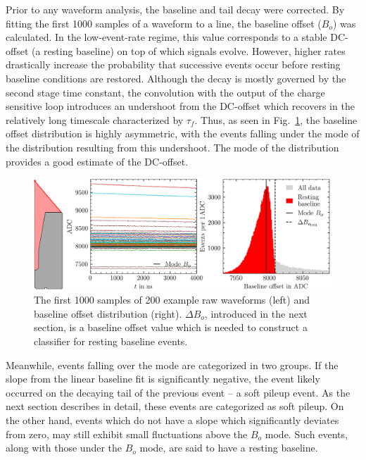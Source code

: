 Prior to any waveform analysis, the baseline and tail decay were corrected. By fitting the first 1000 samples of a waveform to a line, the baseline offset ($B_o$) was calculated. In the low-event-rate regime, this value corresponds to a stable DC-offset (a resting baseline) on top of which signals evolve. However, higher rates drastically increase the probability that successive events occur before resting baseline conditions are restored. Although the decay is mostly governed by the second stage time constant, the convolution with the output of the charge sensitive loop introduces an undershoot from the DC-offset which recovers in the relatively long timescale characterized by $\tau_f$. Thus, as seen in Fig.~\ref{fig:baseline_removal}, the baseline offset distribution is highly asymmetric, with the events falling under the mode of the distribution resulting from this undershoot. The mode of the distribution provides a good estimate of the DC-offset. 
\begin{figure}[htb]
    \centering
    \includegraphics[width=6in]{figs/param/baseline_removal_6_9in.png}
    \caption{The first 1000 samples of 200 example raw waveforms (left) and baseline offset distribution (right). $\Delta B_o$, introduced in the next section, is a baseline offset value which is needed to construct a classifier for resting baseline events.}
    \label{fig:baseline_removal}
	\vspace*{-5pt}
\end{figure}

Meanwhile, events falling over the mode are categorized in two groups. If the slope from the linear baseline fit is significantly negative, the event likely occurred on the decaying tail of the previous event -- a soft pileup event. As the next section describes in detail, these events are categorized as soft pileup. On the other hand, events which do not have a slope which significantly deviates from zero, may still exhibit small fluctuations above the $B_o$ mode. Such events, along with those under the $B_o$ mode, are said to have a resting baseline. 

